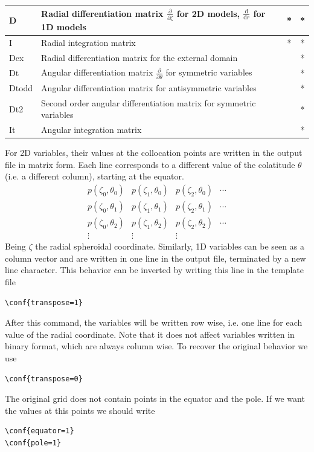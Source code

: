 \begin{longtable}{|l|p{8cm}|c|c|}
\hline
D&Radial differentiation matrix $\frac{\partial}{\partial\zeta}$ for 2D models,
$\frac{\mathrm{d}}{\mathrm{d}r}$ for 1D models&*&*\\
\hline
I&Radial integration matrix&*&*\\
\hline
Dex&Radial differentiation matrix for the external domain&&*\\
\hline
Dt&Angular differentiation matrix $\frac{\partial}{\partial\theta}$ for symmetric variables&&*\\
\hline
Dtodd&Angular differentiation matrix for antisymmetric variables&&*\\
\hline
Dt2&Second order angular differentiation matrix for symmetric variables&&*\\
\hline
It&Angular integration matrix&&*\\
\hline
\end{longtable}
For 2D variables, their values at the collocation points are written in the output file
in matrix form. Each line corresponds to a different value of the colatitude $\theta$
(i.e. a different column), starting at the equator.
$$\begin{array}{cccc}
p(\zeta_0,\theta_0)&p(\zeta_1,\theta_0)&p(\zeta_2,\theta_0)&\cdots\\
p(\zeta_0,\theta_1)&p(\zeta_1,\theta_1)&p(\zeta_2,\theta_1)&\cdots\\
p(\zeta_0,\theta_2)&p(\zeta_1,\theta_2)&p(\zeta_2,\theta_2)&\cdots\\
\vdots&\vdots&\vdots&
\end{array}$$
Being $\zeta$ the radial spheroidal coordinate.
Similarly, 1D variables can be seen as a column vector and are written in one line in the
output file, terminated by a new line character.
This behavior can be inverted by writing this line in the template file
\begin{verbatim}
\conf{transpose=1}
\end{verbatim}
After this command, the variables will be written row wise, i.e. one line for each value of
the radial coordinate. Note that it does not affect variables written in binary format,
which are always column wise. To recover the original behavior we use
\begin{verbatim}
\conf{transpose=0}
\end{verbatim}

The original grid  does not contain points in the equator and the pole. If we want the values
at this points we should write
\begin{verbatim}
\conf{equator=1}
\conf{pole=1}
\end{verbatim}

